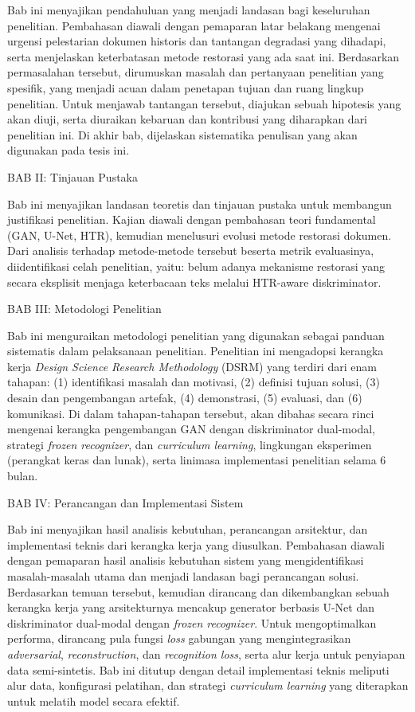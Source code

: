 \documentclass[12pt,a4paper]{article}
\begin{document}
Bab ini menyajikan pendahuluan  yang menjadi landasan bagi keseluruhan penelitian. Pembahasan diawali dengan pemaparan latar belakang mengenai urgensi pelestarian dokumen historis dan tantangan degradasi yang dihadapi, serta menjelaskan keterbatasan metode restorasi yang ada saat ini. Berdasarkan permasalahan tersebut, dirumuskan masalah dan pertanyaan penelitian yang spesifik, yang menjadi acuan dalam penetapan tujuan dan ruang lingkup penelitian. Untuk menjawab tantangan tersebut, diajukan sebuah hipotesis yang akan diuji, serta diuraikan kebaruan dan kontribusi yang diharapkan dari penelitian ini. Di akhir bab, dijelaskan sistematika penulisan yang akan digunakan pada tesis ini.

\vspace{0.5em}
BAB II: Tinjauan Pustaka

Bab ini menyajikan landasan teoretis dan tinjauan pustaka untuk membangun justifikasi penelitian. Kajian diawali dengan pembahasan teori fundamental (GAN, U-Net, HTR), kemudian menelusuri evolusi metode restorasi dokumen. Dari analisis  terhadap metode-metode tersebut beserta metrik evaluasinya, diidentifikasi celah penelitian, yaitu: belum adanya mekanisme restorasi yang secara eksplisit menjaga keterbacaan teks melalui HTR-aware diskriminator.

\vspace{0.5em}
BAB III: Metodologi Penelitian

Bab ini menguraikan metodologi penelitian yang digunakan sebagai panduan sistematis dalam pelaksanaan penelitian. Penelitian ini mengadopsi kerangka kerja \textit{Design Science Research Methodology} (DSRM) yang terdiri dari enam tahapan: (1) identifikasi masalah dan motivasi, (2) definisi tujuan solusi, (3) desain dan pengembangan artefak, (4) demonstrasi, (5) evaluasi, dan (6) komunikasi. Di dalam tahapan-tahapan tersebut, akan dibahas secara rinci mengenai kerangka pengembangan GAN dengan diskriminator dual-modal, strategi \textit{frozen recognizer}, dan \textit{curriculum learning}, lingkungan eksperimen (perangkat keras dan lunak), serta linimasa implementasi penelitian selama 6 bulan.

\vspace{0.5em}
BAB IV: Perancangan dan Implementasi Sistem

Bab ini menyajikan hasil analisis kebutuhan, perancangan arsitektur, dan implementasi teknis dari kerangka kerja yang diusulkan. Pembahasan diawali dengan pemaparan hasil analisis kebutuhan sistem yang mengidentifikasi masalah-masalah utama dan menjadi landasan bagi perancangan solusi. Berdasarkan temuan tersebut, kemudian dirancang dan dikembangkan sebuah kerangka kerja yang arsitekturnya mencakup generator berbasis U-Net dan diskriminator dual-modal dengan \textit{frozen recognizer}. Untuk mengoptimalkan performa, dirancang pula fungsi \textit{loss} gabungan yang mengintegrasikan \textit{adversarial}, \textit{reconstruction}, dan \textit{recognition loss}, serta alur kerja untuk penyiapan data semi-sintetis. Bab ini ditutup dengan detail implementasi teknis meliputi alur data, konfigurasi pelatihan, dan strategi \textit{curriculum learning} yang diterapkan untuk melatih model secara efektif.
\end{document}
